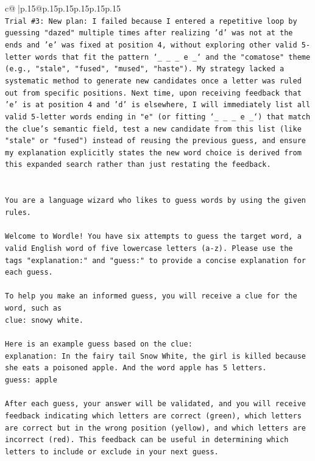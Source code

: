 \documentclass{article}
\begin{document}
{\begin{supertabular}{c@{$\;$}|p{.15\linewidth}@{}p{.15\linewidth}p{.15\linewidth}p{.15\linewidth}p{.15\linewidth}p{.15\linewidth}}
{{{\\ 
\texttt{Trial \#3: New plan: I failed because I entered a repetitive loop by guessing "dazed" multiple times after realizing 'd' was not at the ends and 'e' was fixed at position 4, without exploring other valid 5{-}letter words that fit the pattern `\_ \_ \_ e \_` and the "comatose" theme (e.g., "stale", "fused", "mused", "haste"). My strategy lacked a systematic method to generate new candidates once a letter was ruled out from specific positions. Next time, upon receiving feedback that 'e' is at position 4 and 'd' is elsewhere, I will immediately list all valid 5{-}letter words ending in "e" (or fitting `\_ \_ \_ e \_`) that match the clue's semantic field, test a new candidate from this list (like "stale" or "fused") instead of reusing the previous guess, and ensure my explanation explicitly states the new word choice is derived from this expanded search rather than just restating the feedback.} \\
\\ 
\\ 
\texttt{You are a language wizard who likes to guess words by using the given rules.} \\
\\ 
\texttt{Welcome to Wordle! You have six attempts to guess the target word, a valid English word of five lowercase letters (a{-}z). Please use the tags "explanation:" and "guess:" to provide a concise explanation for each guess.} \\
\\ 
\texttt{To help you make an informed guess, you will receive a clue for the word, such as} \\
\texttt{clue: snowy white.} \\
\\ 
\texttt{Here is an example guess based on the clue:} \\
\texttt{explanation: In the fairy tail Snow White, the girl is killed because she eats a poisoned apple. And the word apple has 5 letters.} \\
\texttt{guess: apple} \\
\\ 
\texttt{After each guess, your answer will be validated, and you will receive feedback indicating which letters are correct (green), which letters are correct but in the wrong position (yellow), and which letters are incorrect (red). This feedback can be useful in determining which letters to include or exclude in your next guess.} \\
\\ 
}}}
\end{supertabular}}
\end{document}
